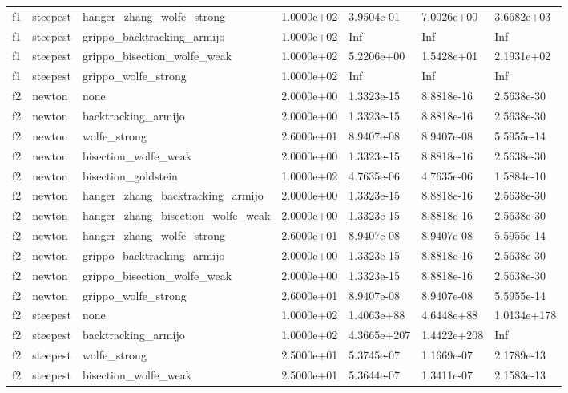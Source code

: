 \documentclass[a4paper,11pt]{article}
\numberwithin{equation}{section} %
\begin{document}
\begin{longtable}{p{1.5cm}|p{1.5cm}|p{4cm}|p{2cm}|p{2cm}|p{2cm}|p{2cm}}
        f1 & steepest & hanger\_zhang\_wolfe\_strong & 1.0000e+02 & 3.9504e-01 & 7.0026e+00 & 3.6682e+03 \\
        f1 & steepest & grippo\_backtracking\_armijo & 1.0000e+02 & Inf & Inf & Inf \\
        f1 & steepest & grippo\_bisection\_wolfe\_weak & 1.0000e+02 & 5.2206e+00 & 1.5428e+01 & 2.1931e+02 \\
        f1 & steepest & grippo\_wolfe\_strong & 1.0000e+02 & Inf & Inf & Inf \\
        f2 & newton & none & 2.0000e+00 & 1.3323e-15 & 8.8818e-16 & 2.5638e-30 \\
        f2 & newton & backtracking\_armijo & 2.0000e+00 & 1.3323e-15 & 8.8818e-16 & 2.5638e-30 \\
        f2 & newton & wolfe\_strong & 2.6000e+01 & 8.9407e-08 & 8.9407e-08 & 5.5955e-14 \\
        f2 & newton & bisection\_wolfe\_weak & 2.0000e+00 & 1.3323e-15 & 8.8818e-16 & 2.5638e-30 \\
        f2 & newton & bisection\_goldstein & 1.0000e+02 & 4.7635e-06 & 4.7635e-06 & 1.5884e-10 \\
        f2 & newton & hanger\_zhang\_backtracking\_armijo & 2.0000e+00 & 1.3323e-15 & 8.8818e-16 & 2.5638e-30 \\
        f2 & newton & hanger\_zhang\_bisection\_wolfe\_weak & 2.0000e+00 & 1.3323e-15 & 8.8818e-16 & 2.5638e-30 \\
        f2 & newton & hanger\_zhang\_wolfe\_strong & 2.6000e+01 & 8.9407e-08 & 8.9407e-08 & 5.5955e-14 \\
        f2 & newton & grippo\_backtracking\_armijo & 2.0000e+00 & 1.3323e-15 & 8.8818e-16 & 2.5638e-30 \\
        f2 & newton & grippo\_bisection\_wolfe\_weak & 2.0000e+00 & 1.3323e-15 & 8.8818e-16 & 2.5638e-30 \\
        f2 & newton & grippo\_wolfe\_strong & 2.6000e+01 & 8.9407e-08 & 8.9407e-08 & 5.5955e-14 \\
        f2 & steepest & none & 1.0000e+02 & 1.4063e+88 & 4.6448e+88 & 1.0134e+178 \\
        f2 & steepest & backtracking\_armijo & 1.0000e+02 & 4.3665e+207 & 1.4422e+208 & Inf \\
        f2 & steepest & wolfe\_strong & 2.5000e+01 & 5.3745e-07 & 1.1669e-07 & 2.1789e-13 \\
        f2 & steepest & bisection\_wolfe\_weak & 2.5000e+01 & 5.3644e-07 & 1.3411e-07 & 2.1583e-13 \\

\end{longtable}
\end{document}
